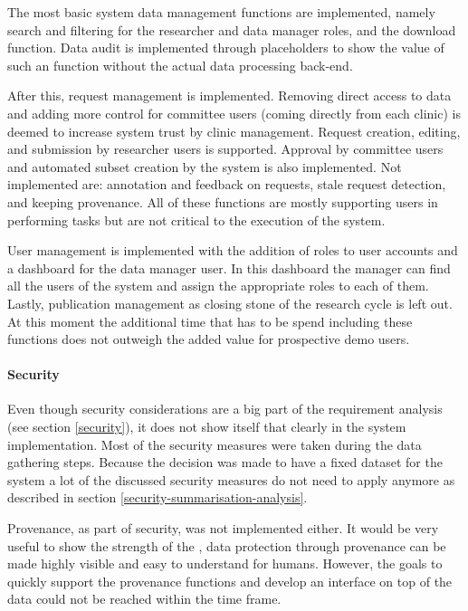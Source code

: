 The most basic system data management functions are implemented, namely 
search and filtering for the researcher and data manager roles, and the download function.
Data audit is implemented through placeholders to show the value of such an function without the actual data processing back-end. 

After this, request management is implemented.
Removing direct access to data and adding more control for committee users (coming directly from each clinic) is deemed to increase system trust by clinic management.
Request creation, editing, and submission by researcher users is supported.
Approval by committee users and automated subset creation by the system is also implemented.
Not implemented are: annotation and feedback on requests, stale request detection, and keeping provenance.
All of these functions are mostly supporting users in performing tasks but are not critical to the execution of the system.

User management is implemented with the addition of roles to user accounts and a dashboard for the data manager user.
In this dashboard the manager can find all the users of the system and assign the appropriate roles to each of them.
Lastly, publication management as closing stone of the research cycle is left out.
At this moment the additional time that has to be spend including these functions does not outweigh the added value for prospective demo users.

\paragraph{Security}
Even though security considerations are a big part of the requirement analysis (see section \ref{security}), it does not show itself that clearly in the system implementation.
Most of the security measures were taken during the data gathering steps.
Because the decision was made to have a fixed dataset for the system a lot of the discussed security measures do not need to apply anymore as described in section \ref{security-summarisation-analysis}.

Provenance, as part of security, was not implemented either.
It would be very useful to show the strength of the \ivfsystem{}, data protection through provenance can be made highly visible and easy to understand for humans.
However, the goals to quickly support the provenance functions and develop an interface on top of the data could not be reached within the time frame.

